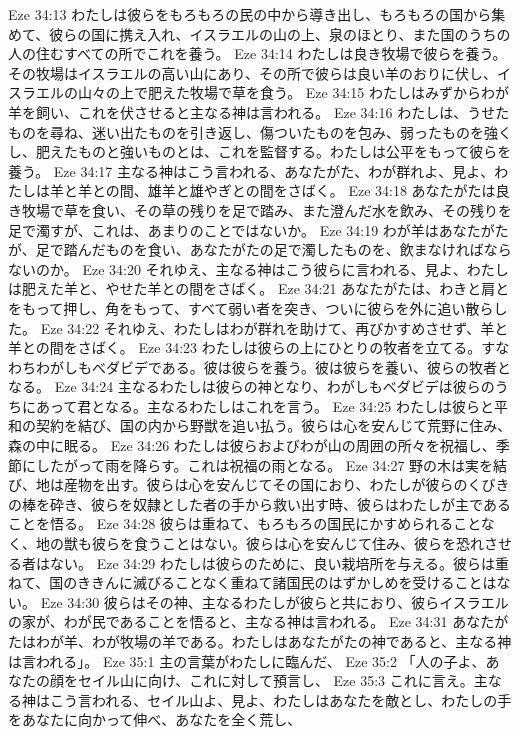 Eze 34:13  わたしは彼らをもろもろの民の中から導き出し、もろもろの国から集めて、彼らの国に携え入れ、イスラエルの山の上、泉のほとり、また国のうちの人の住むすべての所でこれを養う。
Eze 34:14  わたしは良き牧場で彼らを養う。その牧場はイスラエルの高い山にあり、その所で彼らは良い羊のおりに伏し、イスラエルの山々の上で肥えた牧場で草を食う。
Eze 34:15  わたしはみずからわが羊を飼い、これを伏させると主なる神は言われる。
Eze 34:16  わたしは、うせたものを尋ね、迷い出たものを引き返し、傷ついたものを包み、弱ったものを強くし、肥えたものと強いものとは、これを監督する。わたしは公平をもって彼らを養う。
Eze 34:17  主なる神はこう言われる、あなたがた、わが群れよ、見よ、わたしは羊と羊との間、雄羊と雄やぎとの間をさばく。
Eze 34:18  あなたがたは良き牧場で草を食い、その草の残りを足で踏み、また澄んだ水を飲み、その残りを足で濁すが、これは、あまりのことではないか。
Eze 34:19  わが羊はあなたがたが、足で踏んだものを食い、あなたがたの足で濁したものを、飲まなければならないのか。
Eze 34:20  それゆえ、主なる神はこう彼らに言われる、見よ、わたしは肥えた羊と、やせた羊との間をさばく。
Eze 34:21  あなたがたは、わきと肩とをもって押し、角をもって、すべて弱い者を突き、ついに彼らを外に追い散らした。
Eze 34:22  それゆえ、わたしはわが群れを助けて、再びかすめさせず、羊と羊との間をさばく。
Eze 34:23  わたしは彼らの上にひとりの牧者を立てる。すなわちわがしもべダビデである。彼は彼らを養う。彼は彼らを養い、彼らの牧者となる。
Eze 34:24  主なるわたしは彼らの神となり、わがしもべダビデは彼らのうちにあって君となる。主なるわたしはこれを言う。
Eze 34:25  わたしは彼らと平和の契約を結び、国の内から野獣を追い払う。彼らは心を安んじて荒野に住み、森の中に眠る。
Eze 34:26  わたしは彼らおよびわが山の周囲の所々を祝福し、季節にしたがって雨を降らす。これは祝福の雨となる。
Eze 34:27  野の木は実を結び、地は産物を出す。彼らは心を安んじてその国におり、わたしが彼らのくびきの棒を砕き、彼らを奴隷とした者の手から救い出す時、彼らはわたしが主であることを悟る。
Eze 34:28  彼らは重ねて、もろもろの国民にかすめられることなく、地の獣も彼らを食うことはない。彼らは心を安んじて住み、彼らを恐れさせる者はない。
Eze 34:29  わたしは彼らのために、良い栽培所を与える。彼らは重ねて、国のききんに滅びることなく重ねて諸国民のはずかしめを受けることはない。
Eze 34:30  彼らはその神、主なるわたしが彼らと共におり、彼らイスラエルの家が、わが民であることを悟ると、主なる神は言われる。
Eze 34:31  あなたがたはわが羊、わが牧場の羊である。わたしはあなたがたの神であると、主なる神は言われる」。
Eze 35:1  主の言葉がわたしに臨んだ、
Eze 35:2  「人の子よ、あなたの顔をセイル山に向け、これに対して預言し、
Eze 35:3  これに言え。主なる神はこう言われる、セイル山よ、見よ、わたしはあなたを敵とし、わたしの手をあなたに向かって伸べ、あなたを全く荒し、
